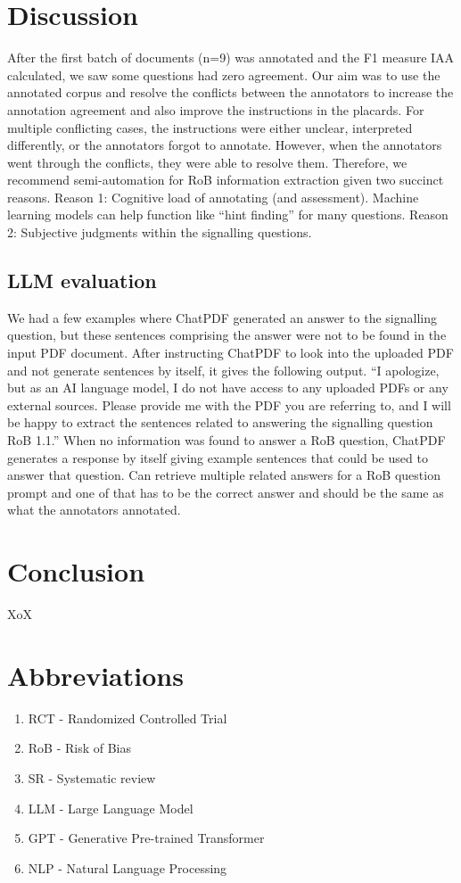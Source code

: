\documentclass[sn-mathphys,Numbered]{sn-jnl}%
\theoremstyle{thmstyleone}%
\theoremstyle{thmstyletwo}%
\theoremstyle{thmstylethree}%
\begin{document}
\section{Discussion}
\label{sec:discussion}
%
After the first batch of documents (n=9) was annotated and the F1 measure IAA calculated, we saw some questions had zero agreement.
Our aim was to use the annotated corpus and resolve the conflicts between the annotators to increase the annotation agreement and also improve the instructions in the placards.
For multiple conflicting cases, the instructions were either unclear, interpreted differently, or the annotators forgot to annotate.
However, when the annotators went through the conflicts, they were able to resolve them.
Therefore, we recommend semi-automation for RoB information extraction given two succinct reasons.
Reason 1: Cognitive load of annotating (and assessment). Machine learning models can help function like ``hint finding'' for many questions.
Reason 2: Subjective judgments within the signalling questions.
%
%
%
\subsection{LLM evaluation}
\label{disc:llm}
%
We had a few examples where ChatPDF generated an answer to the signalling question, but these sentences comprising the answer were not to be found in the input PDF document.
After instructing ChatPDF to look into the uploaded PDF and not generate sentences by itself, it gives the following output.
``I apologize, but as an AI language model, I do not have access to any uploaded PDFs or any external sources. Please provide me with the PDF you are referring to, and I will be happy to extract the sentences related to answering the signalling question RoB 1.1.''
When no information was found to answer a RoB question, ChatPDF generates a response by itself giving example sentences that could be used to answer that question.
Can retrieve multiple related answers for a RoB question prompt and one of that has to be the correct answer and should be the same as what the annotators annotated.

%
%
%
\section{Conclusion}
\label{sec:conclusion}
%
XoX
%
%
%
\section{Abbreviations}%
%
\begin{enumerate}
    \item RCT - Randomized Controlled Trial
    \item RoB - Risk of Bias
    \item SR - Systematic review
    \item LLM - Large Language Model
    \item GPT - Generative Pre-trained Transformer
    \item NLP - Natural Language Processing
\end{enumerate}
%
%
%
\backmatter
\end{document}
